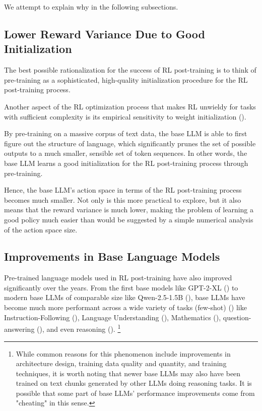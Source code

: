 \documentclass{article} %
\theoremstyle{definition}
\begin{document}
We attempt to explain why in the following subsections.

\subsection{Lower Reward Variance Due to Good Initialization}

The best possible rationalization for the success of RL post-training
is to think of pre-training as a sophisticated, high-quality initialization
procedure for the RL post-training process.

Another aspect of the RL optimization process that makes RL unwieldy 
for tasks with sufficient complexity is its empirical sensitivity to 
weight initialization (\cite{Jones-2021, Andrychowicz-et-al-2020}).

By pre-training on a massive corpus of text data,
the base LLM is able to first figure out the structure of language,
which significantly prunes the set of possible outputs
to a much smaller, sensible set of token sequences.
In other words, the base LLM learns a good initialization for the RL 
post-training process through pre-training.

Hence, the base LLM's action space in terms of the RL post-training process
becomes much smaller. Not only is this more practical to explore, 
but it also means that the reward variance is much lower, making the problem of
learning a good policy much easier than would be suggested by a simple
numerical analysis of the action space size.

\subsection{Improvements in Base Language Models}

Pre-trained language models used in RL post-training
have also improved significantly over the years. From the first base models
like GPT-2-XL (\cite{Radford-et-al-2019}) to modern base LLMs of comparable size 
like Qwen-2.5-1.5B (\cite{Qwen-et-al-2025}), base LLMs have become
much more performant across a wide variety of tasks (few-shot) (\cite{open-llm-leaderboard-v2}) 
like Instruction-Following (\cite{IFEval, BBH}), Language Understanding (\cite{MMLU-Pro}),
Mathematics (\cite{MATH-5}), question-answering (\cite{GPQA, BBH}), and even 
reasoning (\cite{MATH-5, MuSR}).
\footnote{
    While common reasons for this phenomenon include improvements in
    architecture design, training data quality and quantity,
    and training techniques,
    it is worth noting that newer base LLMs may also have been trained on
    text chunks generated by other LLMs doing reasoning tasks.
    It is possible that some part of base LLMs' performance improvements
    come from "cheating" in this sense.
}
\end{document}

